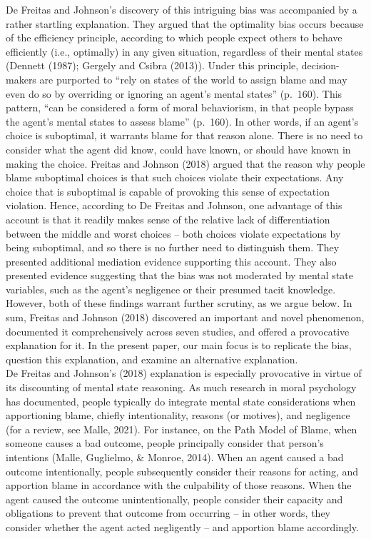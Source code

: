 \documentclass[
  man,floatsintext]{apa6}
\begin{document}
De Freitas and Johnson's discovery of this intriguing bias was accompanied by a rather startling explanation. They argued that the optimality bias occurs because of the efficiency principle, according to which people expect others to behave efficiently (i.e., optimally) in any given situation, regardless of their mental states (Dennett (1987); Gergely and Csibra (2013)). Under this principle, decision-makers are purported to ``rely on states of the world to assign blame and may even do so by overriding or ignoring an agent's mental states'' (p.~160). This pattern, ``can be considered a form of moral behaviorism, in that people bypass the agent's mental states to assess blame'' (p.~160). In other words, if an agent's choice is suboptimal, it warrants blame for that reason alone. There is no need to consider what the agent did know, could have known, or should have known in making the choice. Freitas and Johnson (2018) argued that the reason why people blame suboptimal choices is that such choices violate their expectations. Any choice that is suboptimal is capable of provoking this sense of expectation violation. Hence, according to De Freitas and Johnson, one advantage of this account is that it readily makes sense of the relative lack of differentiation between the middle and worst choices -- both choices violate expectations by being suboptimal, and so there is no further need to distinguish them. They presented additional mediation evidence supporting this account. They also presented evidence suggesting that the bias was not moderated by mental state variables, such as the agent's negligence or their presumed tacit knowledge. However, both of these findings warrant further scrutiny, as we argue below. In sum, Freitas and Johnson (2018) discovered an important and novel phenomenon, documented it comprehensively across seven studies, and offered a provocative explanation for it. In the present paper, our main focus is to replicate the bias, question this explanation, and examine an alternative explanation.\\
De Freitas and Johnson's (2018) explanation is especially provocative in virtue of its discounting of mental state reasoning. As much research in moral psychology has documented, people typically do integrate mental state considerations when apportioning blame, chiefly intentionality, reasons (or motives), and negligence (for a review, see Malle, 2021). For instance, on the Path Model of Blame, when someone causes a bad outcome, people principally consider that person's intentions (Malle, Guglielmo, \& Monroe, 2014). When an agent caused a bad outcome intentionally, people subsequently consider their reasons for acting, and apportion blame in accordance with the culpability of those reasons. When the agent caused the outcome unintentionally, people consider their capacity and obligations to prevent that outcome from occurring -- in other words, they consider whether the agent acted negligently -- and apportion blame accordingly.\\
\end{document}
